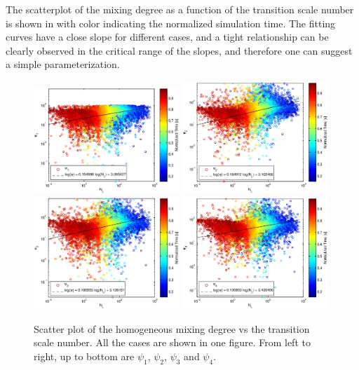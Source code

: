 The scatterplot of the mixing degree as a function of the transition scale number is shown in  with color indicating the normalized simulation time. The fitting curves have a close slope for different cases, and a tight relationship can be clearly observed in the critical range of the slopes, and therefore one can suggest a simple parameterization.
\begin{figure}[!htbp]\centering
\includegraphics[width=0.49\textwidth]{Figures/phi1_NL}
\includegraphics[width=0.49\textwidth]{Figures/phi2_NL}\\
\includegraphics[width=0.49\textwidth]{Figures/phi3_NL}
\includegraphics[width=0.49\textwidth]{Figures/phi4_NL}
\caption{Scatter plot of the homogeneous mixing degree vs the transition scale number. All the cases are shown in one figure. From left to right, up to bottom are $\psi_1$, $\psi_2$, $\psi_3$ and $\psi_4$.\label{fig:mix_degree_nl}}
\end{figure}

